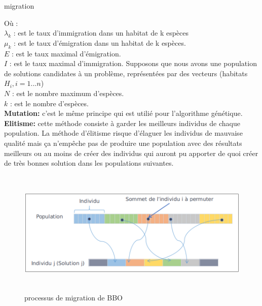 \begin{enumerate}[label=\alph*)]
\begin{algorithm}[H]
\label{alg:MIGRATION}
\caption{migration}
\SetAlgoLined
\DontPrintSemicolon


\end{algorithm}



Où : \\
$\lambda_k$ : est le taux d'immigration dans un habitat de k espèces \\
$\mu_k $ : est le taux d'émigration dans un habitat de k espèces. \\
$E$ : est le taux maximal d'émigration.\\
$I$ : est le taux maximal d'immigration. Supposons que nous avons une population de solutions candidates à un problème, représentées par des vecteurs (habitats $H_i , i = 1...n $)\\
$N$ : est le nombre maximum d'espèces.\\
$k$ : est le nombre d'espèces.\\
\textbf{Mutation:} c’est le même principe qui est utilié pour l’algorithme génétique.\\
\textbf{Elitisme:} cette méthode consiste à garder les meilleurs individus de chaque population. La méthode d’élitisme risque d’élaguer les individus de mauvaise qualité mais ça n’empêche pas de produire une population avec des résultats meilleurs ou au moins de créer des individus qui auront pu apporter de quoi créer de très bonnes solution dans les populations suivantes. \\

\begin{figure}[H]
	\centering
	\includegraphics[width=15cm,height=6cm]{Chap2/7.png}
	\caption{processus de migration de BBO}
	\label{fig:PMBBO}
\end{figure}	
	

\end{enumerate}
